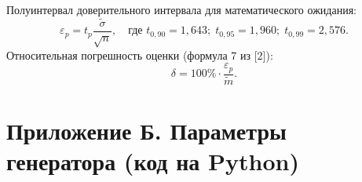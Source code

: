 \documentclass[a4paper,12pt]{article}
\begin{document}
Полуинтервал доверительного интервала для математического ожидания:
\begin{equation}
\varepsilon_p = t_p \frac{\tilde{\sigma}}{\sqrt{n}}, \quad \text{где } t_{0,90}=1{,}643;\; t_{0,95}=1{,}960;\; t_{0,99}=2{,}576.
\end{equation}
Относительная погрешность оценки (формула 7 из [2]):
\begin{equation}
\delta = 100\% \cdot \frac{\varepsilon_p}{\tilde{m}}.
\end{equation}
\appendix
\section*{Приложение Б. Параметры генератора (код на Python)}
\end{document}
